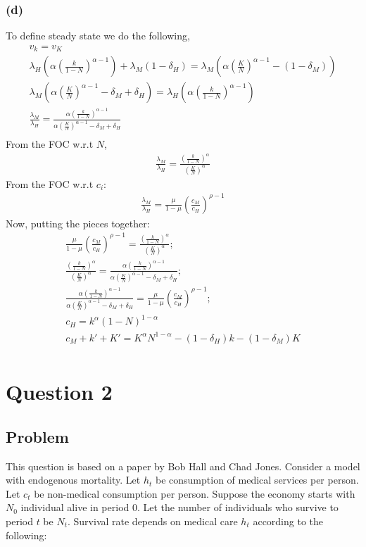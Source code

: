 \documentclass[10pt, a4paper]{article}
\begin{document}
    \subsubsection*{(d)}
      To define steady state we do the following,
      \begin{gather*}
        v_k = v_K \\
        \lambda_H(\alpha(\frac{k}{1-N})^{\alpha-1}) + \lambda_M(1-\delta_H)=\lambda_M(\alpha(\frac{K}{N})^{\alpha-1}-(1-\delta_M)) \\
        \lambda_M(\alpha(\frac{K}{N})^{\alpha-1}-\delta_M+\delta_H) = \lambda_H(\alpha(\frac{k}{1-N})^{\alpha-1}) \\
        \frac{\lambda_M}{\lambda_H} = \frac{\alpha(\frac{k}{1-N})^{\alpha-1}}{\alpha(\frac{K}{N})^{\alpha-1}-\delta_M+\delta_H} \\
      \end{gather*}
      From the FOC w.r.t $N$,
      \begin{gather*}
        \frac{\lambda_M}{\lambda_H} = \frac{({\frac{k}{1-N}})^{\alpha}}{(\frac{K}{N})^{\alpha}}
      \end{gather*}
      From the FOC w.r.t $c_i$:
      \begin{gather*}
        \frac{\lambda_M}{\lambda_H} = \frac{\mu}{1-\mu}(\frac{c_M}{c_H})^{\rho-1}
      \end{gather*}
      Now, putting the pieces together:
      \begin{gather*}
        \frac{\mu}{1-\mu}(\frac{c_M}{c_H})^{\rho-1} = \frac{({\frac{k}{1-N}})^{\alpha}}{(\frac{K}{N})^{\alpha}}; \\
        \frac{({\frac{k}{1-N}})^{\alpha}}{(\frac{K}{N})^{\alpha}} = \frac{\alpha(\frac{k}{1-N})^{\alpha-1}}{\alpha(\frac{K}{N})^{\alpha-1}-\delta_M+\delta_H}; \\
        \frac{\alpha(\frac{k}{1-N})^{\alpha-1}}{\alpha(\frac{K}{N})^{\alpha-1}-\delta_M+\delta_H} = \frac{\mu}{1-\mu}(\frac{c_M}{c_H})^{\rho-1}; \\
        c_H = k^{\alpha}(1-N)^{1-\alpha} \\
        c_M + k' + K' = K^{\alpha}N^{1-\alpha}-(1-\delta_H)k-(1-\delta_M)K \\
      \end{gather*}
\section*{Question 2}
  \subsection*{Problem}
    This question is based on a paper by Bob Hall and Chad Jones. Consider a model with endogenous mortality. Let $h_t$ be consumption of medical services per person. Let $c_t$ be non-medical consumption per person. Suppose the economy starts with $N_0$ individual alive in period 0. Let the number of individuals who survive to period $t$ be $N_t$. Survival rate depends on medical care $h_t$ according to the following:
\end{document}
